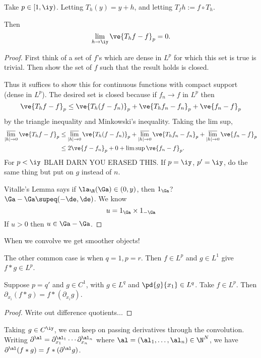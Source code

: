 Take $p\in [1,\iy)$. Letting $T_h(y)=y+h$, and letting $T_fh:=f\circ T_h$.
\begin{lem}
Then
\[
\lim_{h\to \iy} \ve{T_h f-f}_p=0.
\]
\end{lem}
\begin{proof}
First think of a set of $f$'s which are dense in $L^p$ for which this set is true is trivial. Then show the set of $f$ such that the result holds is closed.

Thus it suffices to show this for continuous functions with compact support (dense in $L^p$). The desired set is closed because if $f_n\to f$ in $L^p$ then
\[
\ve{T_hf-f}_p\le \ve{T_h(f-f_n)}_p+\ve{T_hf_n-f_n}_p+\ve{f_n-f}_p
\]
by the triangle inequality and Minkowski's inequality. Taking the lim sup,
\begin{align*}
\varlimsup_{|h|\to 0}\ve{T_hf-f}_p & \le \varlimsup_{|h|\to 0}\ve{T_h(f-f_n)}_p+\varlimsup_{|h|\to 0}\ve{T_hf_n-f_n}_p+\varlimsup_{|h|\to 0}\ve{f_n-f}_p\\
&\le 2\ve{f-f_n}_p+0+\limsup \ve{f_n-f}_p.
\end{align*}
For $p<\iy$ %
BLAH DARN YOU ERASED THIS.
If $p=\iy$, $p'=\iy$, do the same thing %
but put on $g$ instead of $n$.

Vitalle's Lemma says if $\la_{\R}(\Ga)\in (0,y)$, then $1_{\Ga}$? $\Ga-\Ga\supeq (-\de,\de)$. We know 
\[
u=1_{\Ga}\times 1_{-\Ga}
\]
If $u>0$ then $u\in \Ga-\Ga$.
\end{proof}
When we convolve we get smoother objects!

The other common case is when $q=1, p=r$. Then $f\in L^p$ and $g\in L^1$ give $f*g\in L^p$.

\begin{thm}
Suppose $p=q'$ and $g\in C^1$, with $g\in L^q$ and $\pd{g}{x_1}\in L^q$. Take $f\in L^p$. Then $\partial_{x_i}(f*g)=f*(\partial_{x_i}g)$.
\end{thm}
\begin{proof}
Write out difference quotients...
\end{proof}
Taking $g\in C^{\iy}$, we can keep on passing derivatives through the convolution. Writing $\partial^{\al}=\partial_{x_1}^{\al_1}\cdots \partial_{x_n}^{\al_n}$ where $\al=(\al_1,\ldots, \al_n)\in \N^N$, we have $\partial^{\al}(f*g)=f*(\partial^{\al}g)$. %

